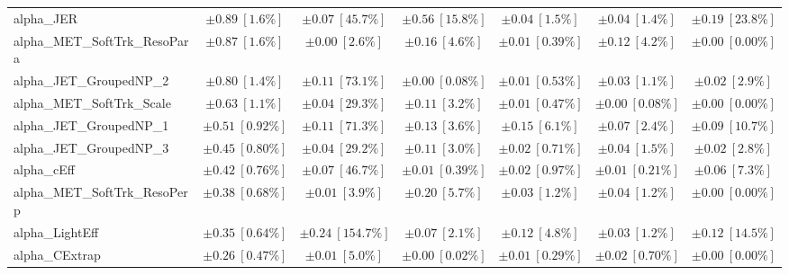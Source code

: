\begin{sidewaystable}
\begin{center}
\begin{tabular*}{\textwidth}{@{\extracolsep{\fill}}lcccccc}
alpha\_JER         & $\pm 0.89\ [1.6\%] $          & $\pm 0.07\ [45.7\%] $          & $\pm 0.56\ [15.8\%] $          & $\pm 0.04\ [1.5\%] $          & $\pm 0.04\ [1.4\%] $          & $\pm 0.19\ [23.8\%] $       \\
alpha\_MET\_SoftTrk\_ResoPara         & $\pm 0.87\ [1.6\%] $          & $\pm 0.00\ [2.6\%] $          & $\pm 0.16\ [4.6\%] $          & $\pm 0.01\ [0.39\%] $          & $\pm 0.12\ [4.2\%] $          & $\pm 0.00\ [0.00\%] $       \\
alpha\_JET\_GroupedNP\_2         & $\pm 0.80\ [1.4\%] $          & $\pm 0.11\ [73.1\%] $          & $\pm 0.00\ [0.08\%] $          & $\pm 0.01\ [0.53\%] $          & $\pm 0.03\ [1.1\%] $          & $\pm 0.02\ [2.9\%] $       \\
alpha\_MET\_SoftTrk\_Scale         & $\pm 0.63\ [1.1\%] $          & $\pm 0.04\ [29.3\%] $          & $\pm 0.11\ [3.2\%] $          & $\pm 0.01\ [0.47\%] $          & $\pm 0.00\ [0.08\%] $          & $\pm 0.00\ [0.00\%] $       \\
alpha\_JET\_GroupedNP\_1         & $\pm 0.51\ [0.92\%] $          & $\pm 0.11\ [71.3\%] $          & $\pm 0.13\ [3.6\%] $          & $\pm 0.15\ [6.1\%] $          & $\pm 0.07\ [2.4\%] $          & $\pm 0.09\ [10.7\%] $       \\
alpha\_JET\_GroupedNP\_3         & $\pm 0.45\ [0.80\%] $          & $\pm 0.04\ [29.2\%] $          & $\pm 0.11\ [3.0\%] $          & $\pm 0.02\ [0.71\%] $          & $\pm 0.04\ [1.5\%] $          & $\pm 0.02\ [2.8\%] $       \\
alpha\_cEff         & $\pm 0.42\ [0.76\%] $          & $\pm 0.07\ [46.7\%] $          & $\pm 0.01\ [0.39\%] $          & $\pm 0.02\ [0.97\%] $          & $\pm 0.01\ [0.21\%] $          & $\pm 0.06\ [7.3\%] $       \\
alpha\_MET\_SoftTrk\_ResoPerp         & $\pm 0.38\ [0.68\%] $          & $\pm 0.01\ [3.9\%] $          & $\pm 0.20\ [5.7\%] $          & $\pm 0.03\ [1.2\%] $          & $\pm 0.04\ [1.2\%] $          & $\pm 0.00\ [0.00\%] $       \\
alpha\_LightEff         & $\pm 0.35\ [0.64\%] $          & $\pm 0.24\ [154.7\%] $          & $\pm 0.07\ [2.1\%] $          & $\pm 0.12\ [4.8\%] $          & $\pm 0.03\ [1.2\%] $          & $\pm 0.12\ [14.5\%] $       \\
alpha\_CExtrap         & $\pm 0.26\ [0.47\%] $          & $\pm 0.01\ [5.0\%] $          & $\pm 0.00\ [0.02\%] $          & $\pm 0.01\ [0.29\%] $          & $\pm 0.02\ [0.70\%] $          & $\pm 0.00\ [0.00\%] $       \\

\end{tabular*}
\end{center}
\end{sidewaystable}

